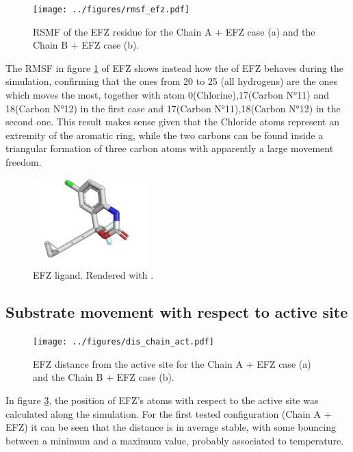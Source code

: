 \documentclass[12pt]{article}
\begin{document}
\begin{figure}[H]
    \centering
    \texttt{[image: ../figures/rmsf\_efz.pdf]}
    \caption{RSMF of the EFZ residue for the Chain A + EFZ case (a) and the Chain B + EFZ case (b).\label{fig:rmsf}}
\end{figure}

The RMSF in figure \ref{fig:rmsf} of EFZ shows instead how the of EFZ behaves during the simulation, confirming that the ones from 20 to 25 (all hydrogens) are the ones which moves the most, together with atom 0(Chlorine),17(Carbon N°11) and 18(Carbon N°12) in the first case and 17(Carbon N°11),18(Carbon N°12) in the second one. This result makes sense given that the Chloride atoms represent an extremity of the aromatic ring, while the two carbons can be found inside a triangular formation of three carbon atoms with apparently a large movement freedom.

\begin{figure}
    \centering
    \includegraphics[width=0.4\textwidth]{../figures/efz.png}
    \caption{EFZ ligand. Rendered with \cite[Pymol]{pymol}.\label{fig:efz}}
\end{figure}

\subsection{Substrate movement with respect to active site}

\begin{figure}[H]
    \centering
    \texttt{[image: ../figures/dis\_chain\_act.pdf]}
    \caption{EFZ distance from the active site for the Chain A + EFZ case (a) and the Chain B + EFZ case (b).\label{fig:dist}}
\end{figure}

In figure \ref{fig:dist}, the position of EFZ's atoms with respect to the active site was calculated along the simulation. For the first tested configuration (Chain A + EFZ) it can be seen that the distance is in average stable, with some bouncing between a minimum and a maximum value, probably associated to temperature.
\end{document}
